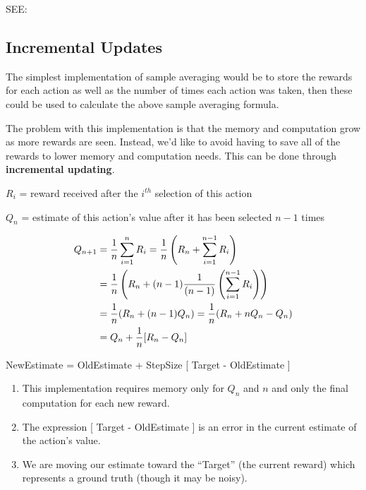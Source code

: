 SEE: 

\subsection{Incremental Updates}
The simplest implementation of sample averaging would be to store the rewards for each action as well as the number of times each action was taken, then these could be used to calculate the above sample averaging formula.

The problem with this implementation is that the memory and computation grow as more rewards are seen. Instead, we’d like to avoid having to save all of the rewards to lower memory and computation needs. This can be done through \textbf{incremental updating}.

\vspace{0.3cm}

$R_i$ = reward received after the $i^{th}$ selection of this action

$Q_n$ = estimate of this action’s value after it has been selected $n-1$ times

\[
\begin{aligned}    
    Q_{n+1} &= \displaystyle\dfrac{1}{n} \sum_{i=1}^{n} R_i = \displaystyle\dfrac{1}{n} \left( R_n + \sum_{i=1}^{n-1} R_i \right) \\
    &= \displaystyle\dfrac{1}{n} \left( R_n + (n-1) \displaystyle\dfrac{1}{(n-1)}  \left(\displaystyle\sum_{i=1}^{n-1} R_i\right) \right)\\
    &= \displaystyle\dfrac{1}{n} (R_n + (n-1)Q_n) = \displaystyle\dfrac{1}{n} (R_n + nQ_n - Q_n)\\
    &= Q_n + \displaystyle\dfrac{1}{n} [R_n - Q_n]
\end{aligned}
\]

NewEstimate = OldEstimate + StepSize [ Target - OldEstimate ]
\vspace{0.2cm}

\begin{enumerate}
    \item This implementation requires memory only for $Q_n$ and $n$ and only the final computation for each new reward.
    \item The expression [ Target - OldEstimate ] is an error in the current estimate of the action’s value.
    \item We are moving our estimate toward the “Target” (the current reward) which represents a ground truth (though it may be noisy).
\end{enumerate}


